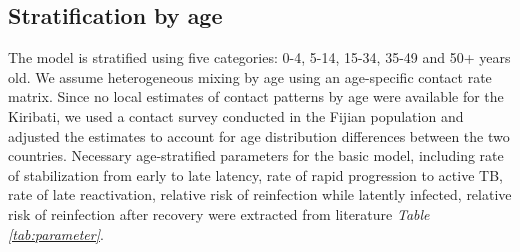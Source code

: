 \subsection{Stratification by age}
The model is stratified using five categories: 0-4, 5-14, 15-34, 35-49 and 50+ years old. We assume 
heterogeneous mixing by age using an age-specific contact rate matrix. Since no local estimates of 
contact patterns by age were available for the Kiribati, we used a contact survey conducted in 
the Fijian population \cite{watson-2017} and adjusted the estimates to account for age distribution differences between
the two countries. Necessary age-stratified parameters for the basic model, including rate of stabilization from early to late latency,
rate of rapid progression to active TB, rate of late reactivation, relative risk of reinfection while latently infected, 
relative risk of reinfection after recovery were extracted from literature \emph{Table \ref{tab:parameter}}.

